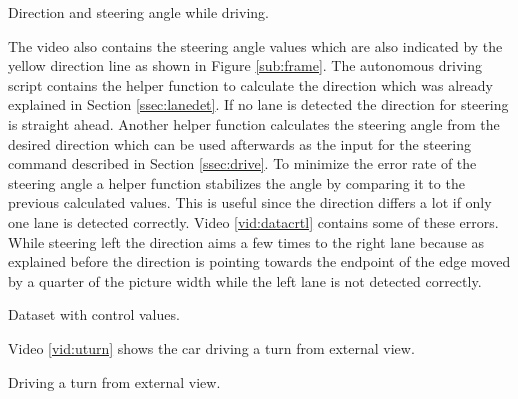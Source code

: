 \documentclass[conference]{IEEEtran}
\begin{document}
\begin{video}[h]
	\caption{Direction and steering angle while driving.}
	\label{vid:autodrive}
	\centering
\end{video}

The video also contains the steering angle values which are also indicated by the yellow direction line as shown in Figure \ref{sub:frame}.
The autonomous driving script contains the helper function to calculate the direction which was already explained in Section \ref{ssec:lanedet}.
If no lane is detected the direction for steering is straight ahead.
Another helper function calculates the steering angle from the desired direction which can be used afterwards as the input for the steering command described in Section \ref{ssec:drive}.
To minimize the error rate of the steering angle a helper function stabilizes the angle by comparing it to the previous calculated values.
This is useful since the direction differs a lot if only one lane is detected correctly.
Video \ref{vid:datacrtl} contains some of these errors.
While steering left the direction aims a few times to the right lane because as explained before the direction is pointing towards the endpoint of the edge moved by a quarter of the picture width while the left lane is not detected correctly.

\begin{video}[h]
	\caption{Dataset with control values.}
	\label{vid:datacrtl}
	\centering
\end{video}

Video \ref{vid:uturn} shows the car driving a turn from external view.

\begin{video}[h]
	\caption{Driving a turn from external view.}
	\label{vid:uturn}
	\centering
\end{video}
\end{document}
